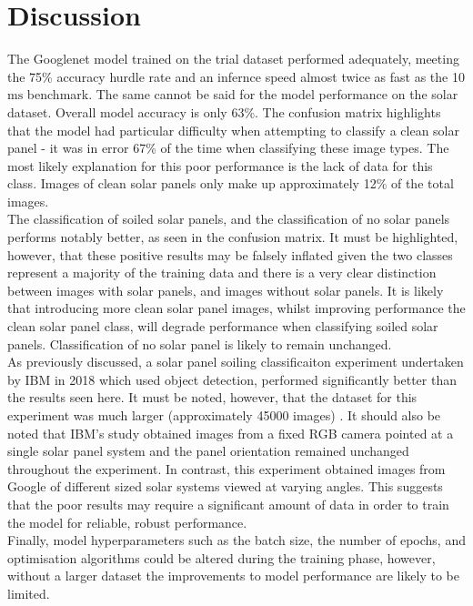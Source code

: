 \documentclass[10pt,journal,compsoc]{IEEEtran}
\begin{document}
		\section{Discussion}
		The Googlenet model trained on the trial dataset performed adequately, meeting the 75\% accuracy hurdle rate and an infernce speed almost twice as fast as the 10$\si{\milli\second}$ benchmark. The same cannot be said for the model performance on the solar dataset. Overall model accuracy is only 63\%. The confusion matrix highlights that the model had particular difficulty when attempting to classify a clean solar panel - it was in error 67\% of the time when classifying these image types. The most likely explanation for this poor performance is the lack of data for this class. Images of clean solar panels only make up approximately 12\% of the total images.\\
		
		The classification of soiled solar panels, and the classification of no solar panels performs notably better, as seen in the confusion matrix. It must be highlighted, however, that these positive results may be falsely inflated given the two classes represent a majority of the training data and there is a very clear distinction between images with solar panels, and images without solar panels. It is likely that introducing more clean solar panel images, whilst improving performance the clean solar panel class, will degrade performance when classifying soiled solar panels. Classification of no solar panel is likely to remain unchanged.\\
		
		As previously discussed, a solar panel soiling classificaiton experiment undertaken by IBM in 2018 which used object detection, performed significantly better than the results seen here. It must be noted, however, that the dataset for this experiment was much larger (approximately 45000 images) \cite{Mehta:2018}. It should also be noted that IBM's study obtained images from a fixed RGB camera pointed at a single solar panel system and the panel orientation remained unchanged throughout the experiment. In contrast, this experiment obtained images from Google of different sized solar systems viewed at varying angles. This suggests that the poor results may require a significant amount of data in order to train the model for reliable, robust performance.\\
		
		Finally, model hyperparameters such as the batch size, the number of epochs, and optimisation algorithms could be altered during the training phase, however, without a larger dataset the improvements to model performance are likely to be limited.
			
\end{document}
